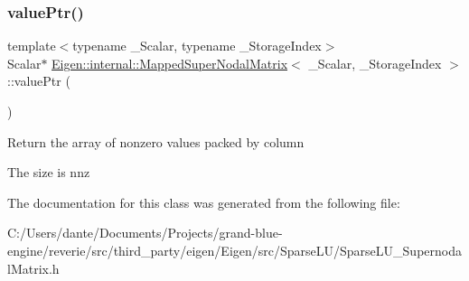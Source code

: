 \subsubsection{\texorpdfstring{valuePtr()}{valuePtr()}}
{\footnotesize\ttfamily template$<$typename \+\_\+\+Scalar, typename \+\_\+\+Storage\+Index$>$ \\
Scalar$\ast$ \mbox{\hyperlink{class_eigen_1_1internal_1_1_mapped_super_nodal_matrix}{Eigen\+::internal\+::\+Mapped\+Super\+Nodal\+Matrix}}$<$ \+\_\+\+Scalar, \+\_\+\+Storage\+Index $>$\+::value\+Ptr (\begin{DoxyParamCaption}{ }\end{DoxyParamCaption})\hspace{0.3cm}{\ttfamily [inline]}}

Return the array of nonzero values packed by column

The size is nnz 

The documentation for this class was generated from the following file\+:\begin{DoxyCompactItemize}
\item 
C\+:/\+Users/dante/\+Documents/\+Projects/grand-\/blue-\/engine/reverie/src/third\+\_\+party/eigen/\+Eigen/src/\+Sparse\+L\+U/Sparse\+L\+U\+\_\+\+Supernodal\+Matrix.\+h\end{DoxyCompactItemize}
